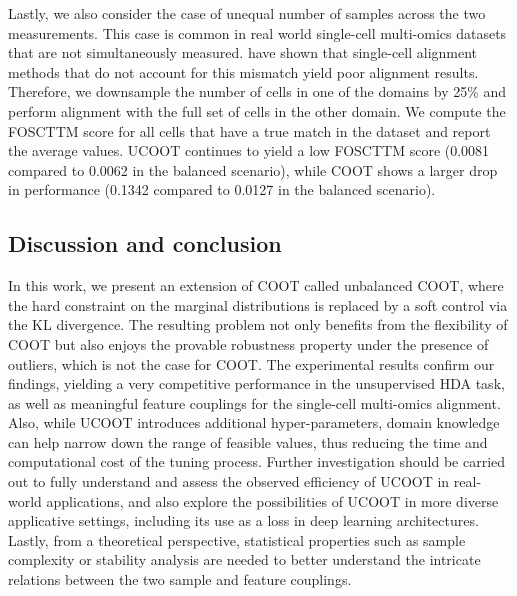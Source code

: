 
Lastly, we also consider the case of unequal number of samples across the two measurements.
This case is common in real world single-cell multi-omics datasets that are not
simultaneously measured. \citet{Demetci22-2} have shown that
single-cell alignment methods that do not account for this mismatch yield poor alignment results.
Therefore, we downsample the number of cells in one of the domains by 25\%
and perform alignment with the full set of cells in the other domain.
We compute the FOSCTTM score for all cells that have a true match in the dataset and
report the average values. UCOOT continues to yield a low FOSCTTM score (0.0081 compared to 0.0062
in the balanced scenario), while COOT shows a larger drop in performance
(0.1342 compared to 0.0127 in the balanced scenario).

\subsection{Discussion and conclusion}
\label{sec:conclusion}

In this work, we present an extension of COOT called unbalanced COOT,
where the hard constraint on the marginal distributions is replaced by a soft control via
the KL divergence. The resulting problem not only benefits from the flexibility of COOT
but also enjoys the provable robustness property under the presence of outliers,
which is not the case for COOT. The experimental results confirm our findings,
yielding a very competitive performance in the unsupervised HDA task, as well as
meaningful feature couplings for the single-cell multi-omics alignment. Also,
while UCOOT introduces additional hyper-parameters, domain knowledge can help narrow down
the range of feasible values, thus reducing the time and computational cost of the tuning process.
Further investigation should be carried out to fully understand and assess
the observed efficiency of UCOOT in real-world applications,
and also explore the possibilities of UCOOT in more diverse applicative settings,
including its use as a loss in deep learning architectures.
Lastly, from a theoretical perspective, statistical properties such as
sample complexity or stability analysis are needed to better understand
the intricate relations between the two sample and feature couplings.

